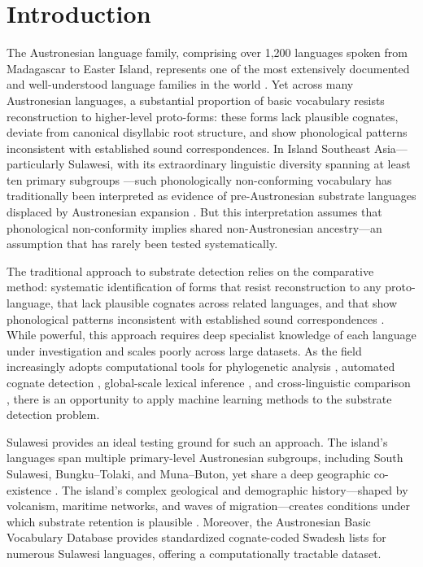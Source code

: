 \documentclass[12pt]{article}
\begin{document}
\section{Introduction}

The Austronesian language family, comprising over 1,200 languages spoken from Madagascar to Easter Island, represents one of the most extensively documented and well-understood language families in the world \citep{blust2013}.
Yet across many Austronesian languages, a substantial proportion of basic vocabulary resists reconstruction to higher-level proto-forms: these forms lack plausible cognates, deviate from canonical disyllabic root structure, and show phonological patterns inconsistent with established sound correspondences.
In Island Southeast Asia---particularly Sulawesi, with its extraordinary linguistic diversity spanning at least ten primary subgroups \citep{blust2009}---such phonologically non-conforming vocabulary has traditionally been interpreted as evidence of pre-Austronesian substrate languages displaced by Austronesian expansion \citep{donohue2010, adelaar2005}.
But this interpretation assumes that phonological non-conformity implies shared non-Austronesian ancestry---an assumption that has rarely been tested systematically.

The traditional approach to substrate detection relies on the comparative method: systematic identification of forms that resist reconstruction to any proto-language, that lack plausible cognates across related languages, and that show phonological patterns inconsistent with established sound correspondences \citep{blust2009, thomason1988}.
While powerful, this approach requires deep specialist knowledge of each language under investigation and scales poorly across large datasets.
As the field increasingly adopts computational tools for phylogenetic analysis \citep{gray2009, list2018}, automated cognate detection \citep{list2012}, global-scale lexical inference \citep{jaeger2018}, and cross-linguistic comparison \citep{forkel2018}, there is an opportunity to apply machine learning methods to the substrate detection problem.

Sulawesi provides an ideal testing ground for such an approach.
The island's languages span multiple primary-level Austronesian subgroups, including South Sulawesi, Bungku--Tolaki, and Muna--Buton, yet share a deep geographic co-existence \citep{himmelmann2005}.
The island's complex geological and demographic history---shaped by volcanism, maritime networks, and waves of migration---creates conditions under which substrate retention is plausible \citep{bellwood1995}.
Moreover, the Austronesian Basic Vocabulary Database \citep[ABVD;][]{greenhill2008} provides standardized cognate-coded Swadesh lists for numerous Sulawesi languages, offering a computationally tractable dataset.
\end{document}
